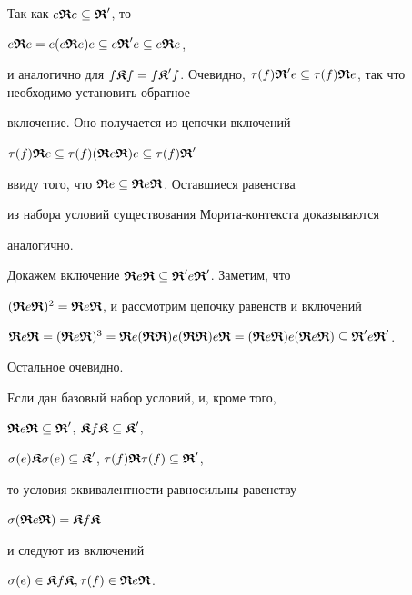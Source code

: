 \begin{pf} Так как $e\R e \subseteq \R'$, то


$ e \R e =e (e \R e) e \subseteq e \R' e \subseteq e \R e$,


и аналогично для $ f \K f = f \K' f$. Очевидно, $ \t(f)\R' e


\subseteq \t(f)\R e$, так что необходимо установить обратное


включение. Оно получается из цепочки включений


$\t(f)\R e \subseteq \t(f)(\R e \R) e \subseteq \t(f)\R'$


ввиду того, что $\R e \subseteq \R e \R $. Оставшиеся равенства


из набора условий существования Морита-контекста доказываются


аналогично.





Докажем включение $\R e \R \subseteq \R' e \R'$. Заметим, что


$(\R e \R)^2=\R e\R$, и рассмотрим цепочку равенств и включений


$\R e \R=(\R e \R)^3=\R e (\R\R) e(\R\R) e \R=


(\R e \R)e(\R e \R)\subseteq \R' e \R'$.


Остальное очевидно.


\end{pf}





\begin{lem} Если дан базовый набор условий, и, кроме того,


$\R e \R \subseteq \R'$, $ \K f \K \subseteq \K' $,


$\s(e)\K\s(e)\subseteq \K'$, $\t(f)\R\t(f)\subseteq\R'$,


то условия эквивалентности равносильны равенству


$\s(\R e \R ) = \K f \K$


и следуют из включений


$\s(e) \in \K f \K , \t(f) \in \R e \R$.


\end{lem}





